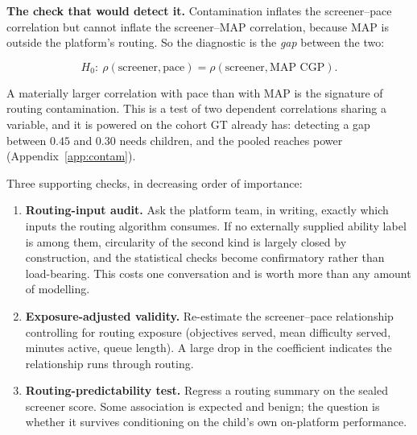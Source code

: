 \documentclass[11pt,a4paper]{article}
\begin{document}


\textbf{The check that would detect it.} Contamination inflates the
screener--pace correlation but cannot inflate the screener--MAP correlation,
because MAP is outside the platform's routing. So the diagnostic is the
\emph{gap} between the two:

\[
H_0:\ \rho(\text{screener},\text{pace}) = \rho(\text{screener},\text{MAP CGP}).
\]

A materially larger correlation with pace than with MAP is the signature of
routing contamination. This is a test of two dependent correlations sharing a
variable, and it is powered on the cohort GT already has: detecting a gap
between $0.45$ and $0.30$ needs \NcontamCheckMid{} children, and the pooled
\Nbothcohorts{} reaches power \PowerBothContam{} (Appendix~\ref{app:contam}).

Three supporting checks, in decreasing order of importance:

\begin{enumerate}[leftmargin=1.4em,itemsep=0.2em]
\item \textbf{Routing-input audit.} Ask the platform team, in writing, exactly
which inputs the routing algorithm consumes. If no externally supplied ability
label is among them, circularity of the second kind is largely closed by
construction, and the statistical checks become confirmatory rather than
load-bearing. This costs one conversation and is worth more than any amount of
modelling.
\item \textbf{Exposure-adjusted validity.} Re-estimate the screener--pace
relationship controlling for routing exposure (objectives served, mean
difficulty served, minutes active, queue length). A large drop in the
coefficient indicates the relationship runs through routing.
\item \textbf{Routing-predictability test.} Regress a routing summary on the
sealed screener score. Some association is expected and benign; the question is
whether it survives conditioning on the child's own on-platform performance.
\end{enumerate}
\end{document}
